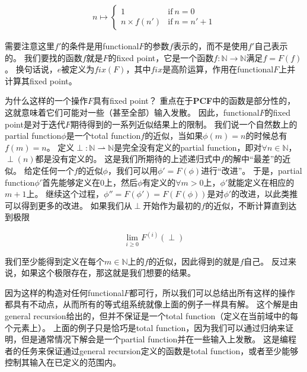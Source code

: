 \begin{align*}
	n \mapsto 
	\left\{
	\begin{array}{ll}
		1 & \mathrm{if\ } n = 0 \\
		n \times f(n') & \mathrm{if\ } n = n' + 1
	\end{array}
	\right.
\end{align*}

需要注意这里\(f'\)的条件是用\gls{functional}\(F\)的参数\(f\)表示的，而不是使用\(f'\)自己表示的。
我们要找的函数\(f\)就是\(F\)的\gls{fixed point}，它是一个函数\(f: \mathbb{N} \rightarrow \mathbb{N}\)满足\(f = F(f)\)。
换句话说，\(e\)被定义为\(fix(F)\)，其中\(fix\)是高阶运算，作用在\gls{functional}\(F\)上并计算其\gls{fixed point}。

为什么这样的一个操作\(F\)具有\gls{fixed point}？
重点在于\textbf{PCF}中的函数是部分性的，这就意味着它们可能对一些（甚至全部）输入发散。
因此，\gls{functional}\(F\)的\gls{fixed point}是对于迭代\(F\)期待得到的一系列近似结果上的限制。
我们说一个自然数上的\gls{partial function}\(\phi\)是一个\gls{total function}\(f\)的近似，当如果\(\phi(m) = n\)的时候总有\(f(m)=n\)。
定义\(\perp: \mathbb{N} \rightharpoonup \mathbb{N}\)是完全没有定义的\gls{partial function}，即对\(\forall n \in \mathbb{N}\)，\(\perp(n)\)都是没有定义的。
这是我们所期待的上述递归式中\(f\)的解中“最差”的近似。
给定任何一个\(f\)的近似\(\phi\)，我们可以用\(\phi' = F(\phi)\)进行“改进”。
于是，\gls{partial function}\(\phi'\)首先能够定义在0上，然后\(\phi\)有定义的\(\forall m > 0\)上，\(\phi'\)就能定义在相应的\(m + 1\)上。
继续这个过程，\(\phi'' = F(\phi') = F(F(\phi))\)是对\(\phi'\)的改进，以此类推可以得到更多的改进。
如果我们从\(\perp\)开始作为最初的\(f\)的近似，不断计算直到达到极限

\[
	\lim_{i \geq 0} F^{(i)}(\perp)
\]

我们至少能得到定义在每个\(m \in \mathbb{N}\)上的\(f\)的近似，因此得到的就是\(f\)自己。
反过来说，如果这个极限存在，那这就是我们想要的结果。

因为这样的构造对任何\gls{functional}\(F\)都可行，所以我们可以总结出所有这样的操作都具有不动点，从而所有的等式组系统就像上面的例子一样具有解。
这个解是由\gls{general recursion}给出的，但并不保证是一个\gls{total function}（定义在当前域中的每个元素上）。
上面的例子只是恰巧是\gls{total function}，因为我们可以通过归纳来证明，但是通常情况下解会是一个\gls{partial function}并在一些输入上发散。
这是编程者的任务来保证通过\gls{general recursion}定义的函数是\gls{total function}，或者至少能够控制其输入在已定义的范围内。
